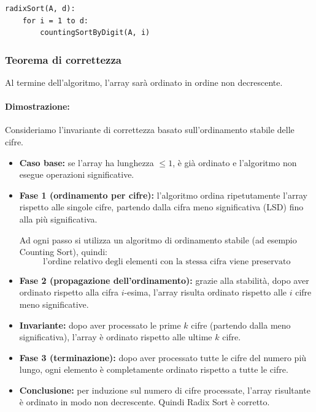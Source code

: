 \documentclass[a4paper,12pt]{article}
\begin{document}
\begin{lstlisting}
radixSort(A, d):
    for i = 1 to d:
        countingSortByDigit(A, i)
\end{lstlisting}
\subsubsection{Teorema di correttezza}
Al termine dell'algoritmo, l'array sarà ordinato in ordine non decrescente.

\paragraph{Dimostrazione:}
Consideriamo l'invariante di correttezza basato sull'ordinamento stabile delle cifre.

\begin{itemize}
    \item \textbf{Caso base:} se l'array ha lunghezza $\le 1$, è già ordinato e l'algoritmo non esegue operazioni significative.

    \item \textbf{Fase 1 (ordinamento per cifre):}
    l'algoritmo ordina ripetutamente l'array rispetto alle singole cifre, partendo dalla cifra meno significativa (LSD) fino alla più significativa.

    Ad ogni passo si utilizza un algoritmo di ordinamento stabile (ad esempio Counting Sort), quindi:
    \[
    \text{l'ordine relativo degli elementi con la stessa cifra viene preservato}
    \]

    \item \textbf{Fase 2 (propagazione dell'ordinamento):}
    grazie alla stabilità, dopo aver ordinato rispetto alla cifra $i$-esima, l'array risulta ordinato rispetto alle $i$ cifre meno significative.

    \item \textbf{Invariante:}
    dopo aver processato le prime $k$ cifre (partendo dalla meno significativa), l'array è ordinato rispetto alle ultime $k$ cifre.

    \item \textbf{Fase 3 (terminazione):}
    dopo aver processato tutte le cifre del numero più lungo, ogni elemento è completamente ordinato rispetto a tutte le cifre.

    \item \textbf{Conclusione:}
    per induzione sul numero di cifre processate, l'array risultante è ordinato in modo non decrescente. Quindi Radix Sort è corretto.
\end{itemize}
\end{document}
